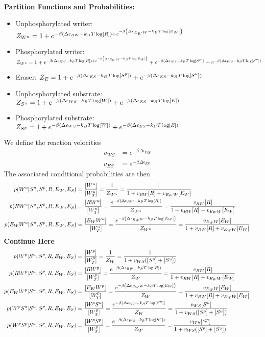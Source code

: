\documentclass[aps,onecolumn,superscriptaddress,notitlepage]{revtex4-1}
\newcommand{\comment}[1]{{\color{blue}#1}}
\begin{document}
\textbf{Partition Functions and Probabilities:}
\begin{itemize}
\item Unphosphorylated writer: $Z_{W^u} = 1 + e^{-\beta\qty(\Delta\epsilon_{RW} -k_BT \log[R]) + e^{-\beta\qty(\Delta\epsilon_{E_WW} -k_BT \log[E_W])}}$
\item Phosphorylated writer: $Z_{W^p} = 1 + e^{-\beta\qty(\Delta\epsilon_{RW} -k_BT \log[R]) + e^{-\beta\qty(\Delta\epsilon_{E_WW} -k_BT \log[E_W])}} + e^{-\beta\qty(\Delta\epsilon_{WS} -k_BT \log[S^p])} + e^{-\beta\qty(\Delta\epsilon_{WS} -k_BT \log[S^u])}$
\item Eraser: $Z_E = 1 + e^{-\beta\qty(\Delta\epsilon_{ES} -k_BT \log[S^p])} + e^{-\beta\qty(\Delta\epsilon_{ES} -k_BT \log[S^u])}$
\item Unphosphorylated substrate: $Z_{S^u} = 1 + e^{-\beta\qty(\Delta\epsilon_{WS} -k_BT \log[W])} + e^{-\beta\qty(\Delta\epsilon_{ES} -k_BT \log[E])}$
\item Phosphorylated substrate: $Z_{S^p} = 1  + e^{-\beta\qty(\Delta\epsilon_{WS} -k_BT \log[W])} + e^{-\beta\qty(\Delta\epsilon_{ES} -k_BT \log[E])}$
\end{itemize}
We define the reaction velocities
\begin{align}
v_{WS} &= e^{-\beta\Delta\epsilon_{WS}}\\
v_{ES} &= e^{-\beta\Delta\epsilon_{ES}}
\end{align}
The associated conditional probabilities are then
\begin{align}
p(W^u|S^u,S^p, R, E_W, E_S) &= \frac{[W^u]}{[W^u_T]} = \frac{1}{Z_{W^u}} =  \frac{1}{1 + v_{RW}[R] + v_{E_WW}[E_W]}\\
p(RW^u|S^u,S^p, R, E_W, E_S) &= \frac{[RW^u]}{[W^u_T]}  = \frac{e^{-\beta\qty(\Delta\epsilon_{RW} -k_BT \log[R])}}{Z_{W^u}} =  \frac{v_{RW}[R]}{1 + v_{RW}[R] + v_{E_WW}[E_W]}\\
p(E_WW^u|S^u,S^p, R, E_W, E_S) &= \frac{[E_WW^u]}{[W^u_T]}  = \frac{e^{-\beta\qty(\Delta\epsilon_{E_WW} -k_BT \log[E_W])}}{Z_{W^u}} =  \frac{ v_{E_WW}[E_W]}{1 + v_{RW}[R] + v_{E_WW}[E_W]}
\end{align}
\comment{\textbf{Continue Here}}
\begin{align}
p(W^p|S^u,S^p, R, E_W, E_S) &= \frac{[W^p]}{[W^p_T]} = \frac{1}{Z_W} =  \frac{1}{1 + v_{WS}([S^p]+[S^u])}\\
p(RW^p|S^u,S^p, R, E_W, E_S) &= \frac{[RW^p]}{[W^p_T]}  = \frac{e^{-\beta\qty(\Delta\epsilon_{RW} -k_BT \log[R])}}{Z_W} =  \frac{v_{RW}[R]}{1 + v_{RW}[R] + v_{E_WW}[E_W]}\\
p(E_WW^p|S^u,S^p, R, E_W, E_S) &= \frac{[E_WW^p]}{[W^p_T]}  = \frac{e^{-\beta\qty(\Delta\epsilon_{E_WW} -k_BT \log[E_W])}}{Z_W} =  \frac{ v_{E_WW}[E_W]}{1 + v_{RW}[R] + v_{E_WW}[E_W]}\\
p(W^pS^u|S^u,S^p, R, E_W, E_S) &= \frac{[W^pS^u]}{[W^p_T]}  = \frac{e^{-\beta\qty(\Delta\epsilon_{WS} -k_BT \log[S^u])}}{Z_W} =  \frac{v_{WS}[S^u]}{1 + v_{WS}([S^p]+[S^u])}\\
p(W^pS^p|S^u,S^p, R, E_W, E_S) &= \frac{[W^pS^p]}{[W^p_T]}  = \frac{e^{-\beta\qty(\Delta\epsilon_{WS} -k_BT \log[S^p])}}{Z_W} =  \frac{v_{WS}[S^p]}{1 + v_{WS}([S^p]+[S^u])}
\end{align}
\end{document}
